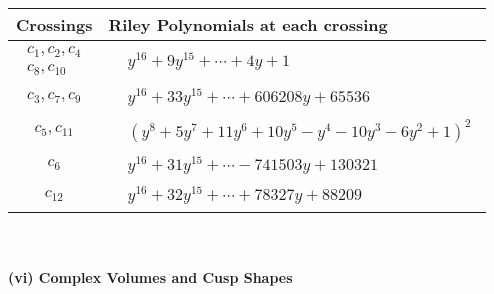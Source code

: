 \documentclass[1p]{elsarticle_modified}
\theoremstyle{definition}
\begin{document}
\begin{tabular}{m{50pt}|m{274pt}}
Crossings & \hspace{64pt}Riley Polynomials at each crossing \\
\hline $$\begin{aligned}c_{1},c_{2},c_{4}\\c_{8},c_{10}\end{aligned}$$&$\begin{aligned}
&y^{16}+9 y^{15}+\cdots+4 y+1
\end{aligned}$\\
\hline $$\begin{aligned}c_{3},c_{7},c_{9}\end{aligned}$$&$\begin{aligned}
&y^{16}+33 y^{15}+\cdots+606208 y+65536
\end{aligned}$\\
\hline $$\begin{aligned}c_{5},c_{11}\end{aligned}$$&$\begin{aligned}
&(y^8+5 y^7+11 y^6+10 y^5- y^4-10 y^3-6 y^2+1)^2
\end{aligned}$\\
\hline $$\begin{aligned}c_{6}\end{aligned}$$&$\begin{aligned}
&y^{16}+31 y^{15}+\cdots-741503 y+130321
\end{aligned}$\\
\hline $$\begin{aligned}c_{12}\end{aligned}$$&$\begin{aligned}
&y^{16}+32 y^{15}+\cdots+78327 y+88209
\end{aligned}$\\
\hline
\end{tabular}\\~\\
\newpage\flushleft \textbf{(vi) Complex Volumes and Cusp Shapes}
\end{document}
